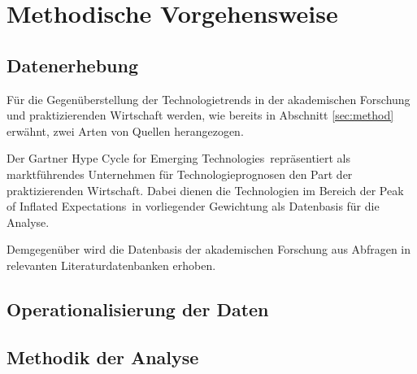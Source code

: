 \section{Methodische Vorgehensweise}
\subsection{Datenerhebung}
Für die Gegenüberstellung der Technologietrends in der akademischen Forschung und praktizierenden Wirtschaft werden, wie bereits in Abschnitt \ref{sec:method} erwähnt, zwei Arten von Quellen herangezogen.

Der \glqq Gartner Hype Cycle for Emerging Technologies\grqq~repräsentiert als marktführendes Unternehmen für Technologieprognosen den Part der praktizierenden Wirtschaft. Dabei dienen die Technologien im Bereich der \glqq Peak of Inflated Expectations\grqq~in vorliegender Gewichtung als Datenbasis für die Analyse.

Demgegenüber wird die Datenbasis der akademischen Forschung aus Abfragen in relevanten Literaturdatenbanken erhoben. 

\subsection{Operationalisierung der Daten}
\subsection{Methodik der Analyse}